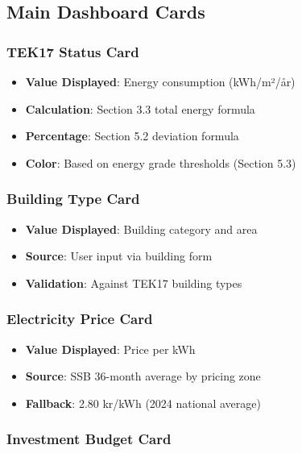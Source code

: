 \documentclass[12pt,a4paper]{article}
\begin{document}
\subsection{Main Dashboard Cards}

\subsubsection{TEK17 Status Card}

\begin{itemize}
\item \textbf{Value Displayed}: Energy consumption (kWh/m²/år)
\item \textbf{Calculation}: Section 3.3 total energy formula
\item \textbf{Percentage}: Section 5.2 deviation formula
\item \textbf{Color}: Based on energy grade thresholds (Section 5.3)
\end{itemize}

\subsubsection{Building Type Card}

\begin{itemize}
\item \textbf{Value Displayed}: Building category and area
\item \textbf{Source}: User input via building form
\item \textbf{Validation}: Against TEK17 building types
\end{itemize}

\subsubsection{Electricity Price Card}

\begin{itemize}
\item \textbf{Value Displayed}: Price per kWh
\item \textbf{Source}: SSB 36-month average by pricing zone
\item \textbf{Fallback}: 2.80 kr/kWh (2024 national average)
\end{itemize}

\subsubsection{Investment Budget Card}
\end{document}
